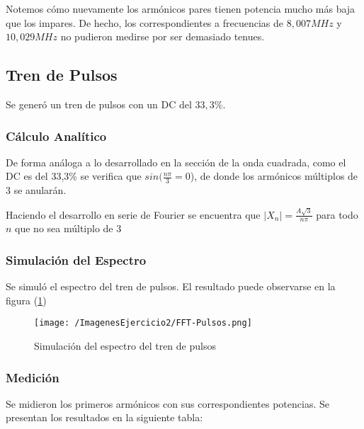 Notemos cómo nuevamente los armónicos pares tienen potencia mucho más baja que los impares. De hecho, los correspondientes a frecuencias de $8,007 MHz$ y $10,029MHz$ no pudieron medirse por ser demasiado tenues.

\subsection{Tren de Pulsos}

Se generó un tren de pulsos con un DC del $33,3\%$. 

\subsubsection{Cálculo Analítico}

De forma análoga a lo desarrollado en la sección de la onda cuadrada, como el DC es del 33,3\% se verifica que $sin(\frac{n\pi}{3}=0$), de donde los armónicos múltiplos de $3$ se anularán. 

Haciendo el desarrollo en serie de Fourier se encuentra que $|X_n|=\frac{A\sqrt{3}}{n\pi}$ para todo $n$ que no sea múltiplo de $3$

\subsubsection{Simulación del Espectro}

Se simuló el espectro del tren de pulsos. El resultado puede observarse en la figura (\ref{fig:simpulso})

\begin{figure}[H]
	\centering
	\texttt{[image: /ImagenesEjercicio2/FFT-Pulsos.png]}
\caption{Simulación del espectro del tren de pulsos}
	\label{fig:simpulso}
\end{figure}

\subsubsection{Medición}

Se midieron los primeros armónicos con sus correspondientes potencias. Se presentan los resultados en la siguiente tabla:

\begin{table}[H]
\end{table}

